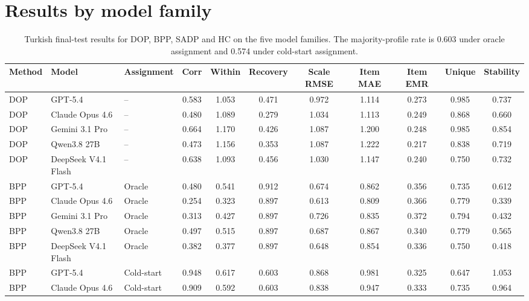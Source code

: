 \clearpage

\appendix


\section{Results by model family}
\label{app:a}

\begin{table}[pos=!htbp]
\scriptsize\centering\setlength{\tabcolsep}{2.5pt}
\caption{Turkish final-test results for DOP, BPP, SADP and HC on the five model families. The majority-profile rate is 0.603 under oracle assignment and 0.574 under cold-start assignment.}
\label{tab:grid-tr}
\begin{tabular*}{\textwidth}{@{\extracolsep{\fill}}lllcccccccc@{}}
\toprule
Method & Model & Assignment & Corr & Within & Recovery & Scale RMSE & Item MAE & Item EMR & Unique & Stability \\
\midrule
DOP & GPT-5.4 & -- & 0.583 & 1.053 & 0.471 & 0.972 & 1.114 & 0.273 & 0.985 & 0.737 \\
DOP & Claude Opus 4.6 & -- & 0.480 & 1.089 & 0.279 & 1.034 & 1.113 & 0.249 & 0.868 & 0.660 \\
DOP & Gemini 3.1 Pro & -- & 0.664 & 1.170 & 0.426 & 1.087 & 1.200 & 0.248 & 0.985 & 0.854 \\
DOP & Qwen3.8 27B & -- & 0.473 & 1.156 & 0.353 & 1.087 & 1.222 & 0.217 & 0.838 & 0.719 \\
DOP & DeepSeek V4.1 Flash & -- & 0.638 & 1.093 & 0.456 & 1.030 & 1.147 & 0.240 & 0.750 & 0.732 \\
\addlinespace[2pt]
BPP & GPT-5.4 & Oracle & 0.480 & 0.541 & 0.912 & 0.674 & 0.862 & 0.356 & 0.735 & 0.612 \\
BPP & Claude Opus 4.6 & Oracle & 0.254 & 0.323 & 0.897 & 0.613 & 0.809 & 0.366 & 0.779 & 0.339 \\
BPP & Gemini 3.1 Pro & Oracle & 0.313 & 0.427 & 0.897 & 0.726 & 0.835 & 0.372 & 0.794 & 0.432 \\
BPP & Qwen3.8 27B & Oracle & 0.497 & 0.515 & 0.897 & 0.687 & 0.867 & 0.340 & 0.779 & 0.565 \\
BPP & DeepSeek V4.1 Flash & Oracle & 0.382 & 0.377 & 0.897 & 0.648 & 0.854 & 0.336 & 0.750 & 0.418 \\
BPP & GPT-5.4 & Cold-start & 0.948 & 0.617 & 0.603 & 0.868 & 0.981 & 0.325 & 0.647 & 1.053 \\
BPP & Claude Opus 4.6 & Cold-start & 0.909 & 0.592 & 0.603 & 0.838 & 0.947 & 0.333 & 0.735 & 0.964 \\

\end{tabular*}
\end{table}
